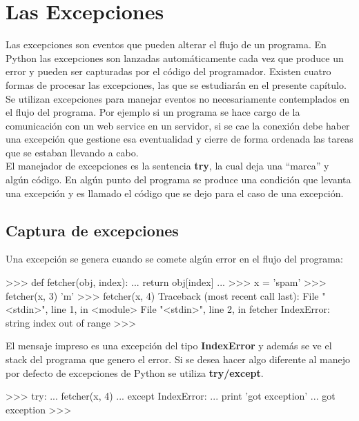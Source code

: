 \section{Las Excepciones}

Las excepciones son eventos que pueden alterar el flujo de un programa. En Python las excepciones son lanzadas automáticamente cada vez que produce un error y pueden ser capturadas por el código del programador. Existen cuatro formas de procesar las excepciones, las que se estudiarán en el presente capítulo.\\

Se utilizan excepciones para manejar eventos no necesariamente contemplados en el flujo del programa. Por ejemplo si un programa se hace cargo de la comunicación con un web service en un servidor, si se cae la conexión debe haber una excepción que gestione esa eventualidad y cierre de forma ordenada las tareas que se estaban llevando a cabo.\\

El manejador de excepciones es la sentencia \textbf{try}, la cual deja una ``marca'' y algún código. En algún punto del programa se produce una condición que levanta una excepción y es llamado el código que se dejo para el caso de una excepción.

\subsection{Captura de excepciones}

Una excepción se genera cuando se comete algún error en el flujo del programa:\\

\begin{pyglist} [language=python]
>>> def fetcher(obj, index):
...     return obj[index]
... 
>>> x = 'spam'
>>> fetcher(x, 3)
'm'
>>> fetcher(x, 4)
Traceback (most recent call last):
  File "<stdin>", line 1, in <module>
  File "<stdin>", line 2, in fetcher
IndexError: string index out of range
>>> 
\end{pyglist}

El mensaje impreso es una excepción del tipo \textbf{IndexError} y además se ve el stack del programa que genero el error. Si se desea hacer algo diferente al manejo por defecto de excepciones de Python se utiliza \textbf{try/except}.\\

\begin{pyglist} [language=python]
>>> try:
...     fetcher(x, 4)
... except IndexError:
...     print 'got exception'
... 
got exception
>>> 
\end{pyglist}

